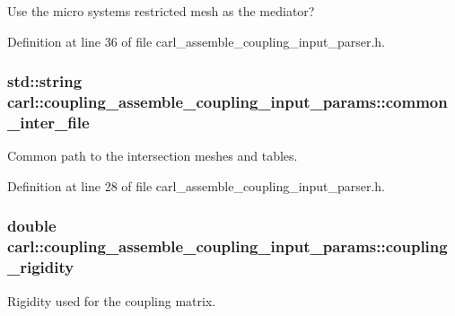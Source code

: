 Use the micro system\textquotesingle{}s restricted mesh as the mediator? 



Definition at line 36 of file carl\+\_\+assemble\+\_\+coupling\+\_\+input\+\_\+parser.\+h.

\hypertarget{structcarl_1_1coupling__assemble__coupling__input__params_aa922a4b0252168abcfd52a9eb3e2b796}{}
\subsubsection[{common\+\_\+inter\+\_\+file}]{\setlength{\rightskip}{0pt plus 5cm}std\+::string carl\+::coupling\+\_\+assemble\+\_\+coupling\+\_\+input\+\_\+params\+::common\+\_\+inter\+\_\+file}\label{structcarl_1_1coupling__assemble__coupling__input__params_aa922a4b0252168abcfd52a9eb3e2b796}


Common path to the intersection meshes and tables. 



Definition at line 28 of file carl\+\_\+assemble\+\_\+coupling\+\_\+input\+\_\+parser.\+h.

\hypertarget{structcarl_1_1coupling__assemble__coupling__input__params_a9f0e82658b0e37c16faed3bc3a176dc1}{}
\subsubsection[{coupling\+\_\+rigidity}]{\setlength{\rightskip}{0pt plus 5cm}double carl\+::coupling\+\_\+assemble\+\_\+coupling\+\_\+input\+\_\+params\+::coupling\+\_\+rigidity}\label{structcarl_1_1coupling__assemble__coupling__input__params_a9f0e82658b0e37c16faed3bc3a176dc1}


Rigidity used for the coupling matrix. 



